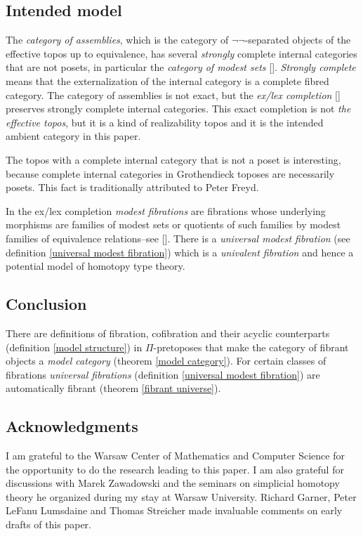 \documentclass{tac}
\newcommand\citep[1]{[\cite{#1}]}
\begin{document}
\subsection*{Intended model} The \emph{category of assemblies}, which is the category of $\neg\neg$-separated objects of the effective topos up to equivalence, has several \emph{strongly} complete internal categories that are not posets, in particular the \emph{category of modest sets} \citep{MR1097022,MR2479466,MR1023803}. \emph{Strongly complete} means that the externalization of the internal category is a complete fibred category. The category of assemblies is not exact, but the \emph{ex/lex completion} \citep{MR1600009} preserves strongly complete internal categories. This exact completion is not \emph{the effective topos}, but it is a kind of realizability topos and it is the intended ambient category in this paper. 

The topos with a complete internal category that is not a poset is interesting, because complete internal categories in Grothendieck toposes are necessarily posets. This fact is traditionally attributed to Peter Freyd.

In the ex/lex completion \emph{modest fibrations} are fibrations whose underlying morphisms are families of modest sets or quotients of such families by modest families of equivalence relations--see \citep{MR1097022,MR1023803,MR2479466}. There is a \emph{universal modest fibration} (see definition \ref{universal modest fibration}) which is a \emph{univalent fibration} and hence a potential model of homotopy type theory.

\subsection*{Conclusion} There are definitions of fibration, cofibration and their acyclic counterparts (definition \ref{model structure}) in $\Pi$-pretoposes that make the category of fibrant objects a \emph{model category} (theorem \ref{model category}). For certain classes of fibrations \emph{universal fibrations} (definition \ref{universal modest fibration}) are automatically fibrant (theorem \ref{fibrant universe}).

\subsection*{Acknowledgments} 
I am grateful to the Warsaw Center of Mathematics and Computer Science for the opportunity to do the research leading to this paper. I am also grateful for discussions with Marek Zawadowski and the seminars on simplicial homotopy theory he organized during my stay at Warsaw University. Richard Garner, Peter LeFanu Lumsdaine and Thomas Streicher made invaluable comments on early drafts of this paper.













\printbibliography
\end{document}
